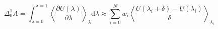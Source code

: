 


\[ \Delta_0^1 A = \int_{\lambda=0}^{\lambda=1} \left< \frac{\partial
    U(\lambda)}{\partial\lambda} \right>_\lambda \mathrm{d}\lambda
\approx \sum_{i=0}^N w_i \left< \frac{U(\lambda_{i} + \delta) -
    U(\lambda_i)}{\delta} \right>_{\lambda_i} \]


